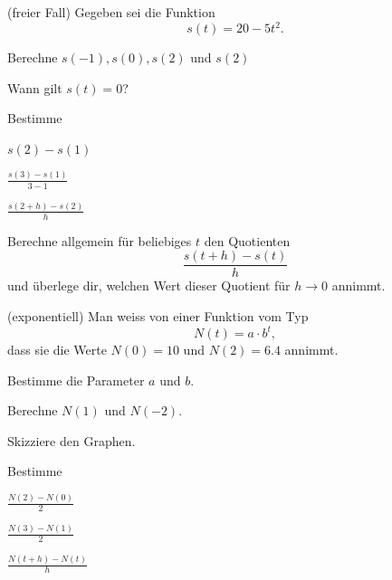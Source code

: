 \documentclass[%
11pt,%
twoside,%
titlepage,%
german,%
headsepline%
]{scrartcl}
\begin{document}
\begin{ueb}(freier Fall)
Gegeben sei die Funktion
$$s(t)=20-5t^2.$$
\begin{enumeratea}
\item Berechne $s(-1),s(0),s(2)$ und $s(2)$
\item Wann gilt $s(t)=0$?
\item Bestimme
\begin{enumeratei}
\item $s(2)-s(1)$
\item $\frac{s(3)-s(1)}{3-1}$
\item $\frac{s(2+h)-s(2)}{h}$
\end{enumeratei}
\item Berechne allgemein für beliebiges $t$ den Quotienten
$$\frac{s(t+h)-s(t)}{h}$$
und überlege dir, welchen Wert dieser Quotient für $h\to0$ annimmt.
\end{enumeratea}
\end{ueb}

\begin{ueb}(exponentiell)
Man weiss von einer Funktion vom Typ
$$N(t)=a\cdot b^t,$$
dass sie die Werte $N(0)=10$ und $N(2)=6.4$ annimmt.
\begin{enumeratea}
\item Bestimme die Parameter $a$ und $b$.
\item Berechne $N(1)$ und $N(-2)$.
\item Skizziere den Graphen.
\item Bestimme
\begin{enumeratei}
\item $\frac{N(2)-N(0)}{2}$
\item $\frac{N(3)-N(1)}{2}$
\item $\frac{N(t+h)-N(t)}{h}$
\end{enumeratei}
\end{enumeratea}
\end{ueb}

\pagebreak
\end{document}
